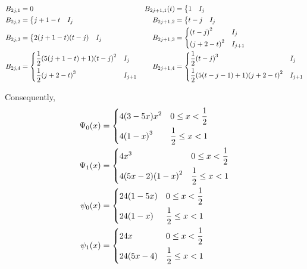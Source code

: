 \documentclass[a4paper, 11pt]{article}
\begin{document}
\begin{align*}
  B_{2j, 1} &= 0 & B_{2j+1,1}(t) &= \begin{dcases} 1 & I_j \end{dcases} \\
  B_{2j, 2}  &= \begin{dcases} j+1-t & I_j \end{dcases} & B_{2j+1, 2}  &= \begin{dcases} t-j & I_j \end{dcases} \\
  B_{2j, 3} & = \begin{dcases} 2(j+1-t)(t-j) & I_j \end{dcases} & B_{2j+1, 3}  &= \begin{dcases} {(t-j)}^2 & I_j \\ 
  {(j+2-t)}^2 & I_{j+1} \end{dcases} \\
  B_{2j, 4} & = \begin{dcases} \frac{1}{2}(5(j+1-t)+1){(t-j)}^2 & I_j \\ \frac{1}{2}{(j+2-t)}^3 & I_{j+1} \end{dcases} & 
  B_{2j+1,4}  &= \begin{dcases} \frac{1}{2}{(t-j)}^3 & I_j \\ \frac{1}{2}(5(t-j-1)+1){(j+2-t)}^2 & I_{j+1} \end{dcases}
\end{align*}

Consequently,
\begin{align*}
  \Psi_0(x) &= \begin{dcases} 4(3-5x)x^2 & 0 \leq x < \frac{1}{2} \\ 4{(1-x)}^3 & \frac{1}{2}\leq x < 1 \end{dcases} \\
  \Psi_1(x) &= \begin{dcases} 4x^3 & 0 \leq x < \frac{1}{2} \\ 4(5x-2){(1-x)}^2 & \frac{1}{2}\leq x < 1 \end{dcases} \\
  \psi_0(x) &= \begin{dcases} 24(1-5x) & 0 \leq x < \frac{1}{2} \\ 24(1-x) & \frac{1}{2}\leq x < 1 \end{dcases} \\
  \psi_1(x) &= \begin{dcases} 24x & 0 \leq x < \frac{1}{2} \\ 24(5x-4) & \frac{1}{2}\leq x < 1 \end{dcases}
\end{align*}
\end{document}
